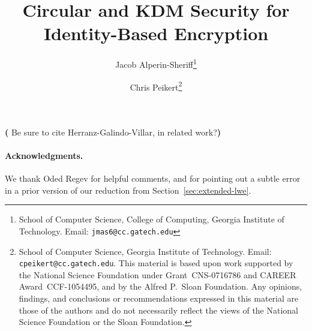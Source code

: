 \documentclass[letterpaper,11pt]{article}
\title{Circular and KDM Security for Identity-Based Encryption}
\author{%
  Jacob Alperin-Sheriff\footnote{School of Computer Science, College of
    Computing, Georgia Institute of Technology. Email: \texttt{jmas6@cc.gatech.edu}}
  \and Chris Peikert\footnote{School of Computer Science, Georgia
    Institute of Technology.  Email: \texttt{cpeikert@cc.gatech.edu}.
    This material is based upon work supported by the National Science
    Foundation under Grant~CNS-0716786 and CAREER Award~CCF-1054495,
    and by the Alfred P.~Sloan Foundation.  Any opinions, findings,
    and conclusions or recommendations expressed in this material are
    those of the authors and do not necessarily reflect the views of
    the National Science Foundation or the Sloan Foundation.}
}
\newif\ifnotes\notesfalse
\newcommand{\cnote}[1]{{\bf (\color{blue}{Chris:}} {#1}{\bf ) }}
\newcommand{\cnote}[1]{}
\begin{document}
\maketitle

\begin{abstract}
  \ifnotes \begin{center}{\Huge{WARNING: NOTES ARE ON}}\end{center} \fi
  
\end{abstract}

\cnote{Be sure to cite Herranz-Galindo-Villar, in related work?}













\paragraph{Acknowledgments.}

We thank Oded Regev for helpful comments, and for pointing out a
subtle error in a prior version of our reduction from
Section~\ref{sec:extended-lwe}.



\end{document}
